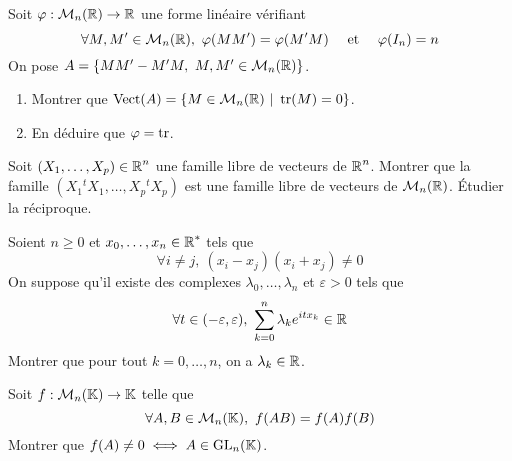 \begin{exo}
    \label{al1}
    Soit $\varphi : \mathcal M_n(\operatorname{\mathbb R})\to \operatorname{\mathbb R}$ une forme linéaire vérifiant
    \[\forall M,M'\in \mathcal M_n(\operatorname{\mathbb R}),\ \varphi(MM')=\varphi(M'M)\quad \text{ et }\quad \varphi(I_n)=n\]
    On pose $A=\lbrace MM'-M'M,\ M,M'\in \mathcal M_n(\operatorname{\mathbb R})\rbrace$. 
    \begin{enumerate}
        \item Montrer que $\operatorname{Vect}(A)=\lbrace M\in \mathcal M_n(\operatorname{\mathbb R})\ |\ \operatorname{tr}(M)=0\rbrace$.
        \item En déduire que $\varphi=\operatorname{tr}$.
    \end{enumerate}
\end{exo}

\begin{exo}
    \label{al2}
	Soit $(X_1,\dots,X_p)\in\operatorname{\mathbb R}^n$ une famille libre de vecteurs de $\operatorname{\mathbb R}^n$. Montrer que la famille $(X_1{}^tX_1,\dots,X_p{}^tX_p)$ est une famille libre de vecteurs de $\mathcal M_n(\operatorname{\mathbb R})$. Étudier la réciproque.
\end{exo}

\begin{exo}
    Soient $n\geq 0$ et $x_0,\dots,x_n\in\operatorname{\mathbb R}^*$ tels que 
    \[
        \forall i\neq j,\ (x_i-x_j)(x_i+x_j)\neq 0    
    \]
    On suppose qu'il existe des complexes $\lambda_0,\dots,\lambda_n$ et $\varepsilon > 0$ tels que 
    \[
        \forall t\in(-\varepsilon,\varepsilon),\ \sum_{k=0}^n\lambda_ke^{itx_k}\in\R    
    \]
    Montrer que pour tout $k=0,\dots,n$, on a $\lambda_k\in\operatorname{\mathbb R}$.
\end{exo}

\begin{exo}
    Soit $f:\mathcal M_n(\operatorname{\mathbb K})\to \operatorname{\mathbb K}$ telle que 
    \[
        \forall A,B\in\mathcal M_n(\K),\ f(AB)=f(A)f(B)    
    \]
    Montrer que $f(A)\neq 0\iff A\in\operatorname{GL}_n(\operatorname{\mathbb K})$.
\end{exo}
    